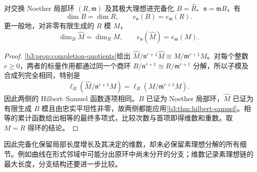 \begin{theorem}\label{b3:thm:completion-dimension}
	对交换 Noether 局部环 \((R,\mathfrak m)\) 及其极大理想进完备化 \(B=\widehat R\)、\(\mathfrak n=\mathfrak mB\)，有
	\[
		\dim B=\dim R,\qquad e_{\mathfrak n}(B)=e_{\mathfrak m}(R).
	\]
	更一般地，对非零有限生成的 \(R\) 模 \(M\)，
	\[
		\dim_B\widehat M=\dim_RM,\qquad e_{\mathfrak n}(\widehat M)=e_{\mathfrak m}(M).
	\]
\end{theorem}
\begin{proof}
	\cref{b3:prop:completion-quotients}给出 \(\widehat M/\mathfrak n^{r+1}\widehat M\cong M/\mathfrak m^{r+1}M\)。对每个整数 \(r\ge0\)，两者的标量作用都通过同一个商环 \(B/\mathfrak n^{r+1}\cong R/\mathfrak m^{r+1}\) 分解，所以子模及合成列完全相同，特别是
	\[
		\ell_B(\widehat M/\mathfrak n^{r+1}\widehat M) =\ell_R(M/\mathfrak m^{r+1}M).
	\]
	因此两侧的 Hilbert–Samuel 函数逐项相同。\(B\) 已证为 Noether 局部环，\(\widehat M\) 已证为有限生成 \(B\) 模且由忠实平坦性非零，故两侧都能应用\cref{b3:thm:hilbert-samuel}。相等的累计函数给出相等的最终多项式，比较次数与首项即得维数和重数。取 \(M=R\) 得环的结论。
\end{proof}

因此完备化保留局部长度增长及其决定的维数，却未必保留素理想分解的所有细节。例如曲线在形式邻域中可能分出原环中尚未分开的分支；维数记录素理想链的最大长度，分支结构还要进一步比较。
